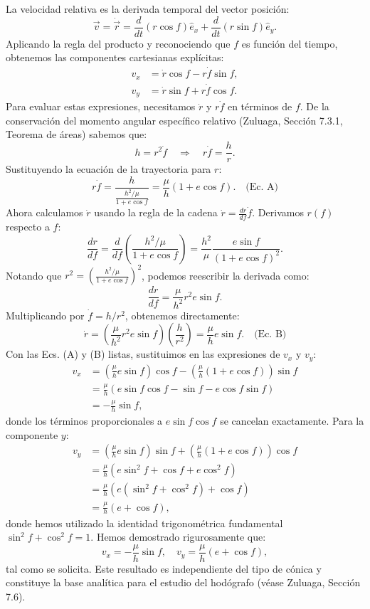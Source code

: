 \documentclass[12pt, a4paper]{article}
\begin{document}
La velocidad relativa es la derivada temporal del vector posición:
$$
\vec{v} = \dot{\vec{r}} = \frac{d}{dt}\left( r \cos f \right) \hat{e}_x + \frac{d}{dt}\left( r \sin f \right) \hat{e}_y.
$$
Aplicando la regla del producto y reconociendo que $f$ es función del tiempo, obtenemos las componentes cartesianas explícitas:
\begin{align*}
v_x &= \dot{r} \cos f - r \dot{f} \sin f, \\
v_y &= \dot{r} \sin f + r \dot{f} \cos f.
\end{align*}
Para evaluar estas expresiones, necesitamos $\dot{r}$ y $r\dot{f}$ en términos de $f$. De la conservación del momento angular específico relativo (Zuluaga, Sección 7.3.1, Teorema de áreas) sabemos que:
$$
h = r^2 \dot{f} \quad \Longrightarrow \quad r\dot{f} = \frac{h}{r}.
$$
Sustituyendo la ecuación de la trayectoria para $r$:
$$
r\dot{f} = \frac{h}{\frac{h^2/\mu}{1 + e \cos f}} = \frac{\mu}{h} (1 + e \cos f). \quad \text{(Ec. A)}
$$
Ahora calculamos $\dot{r}$ usando la regla de la cadena $\dot{r} = \frac{dr}{df} \dot{f}$. Derivamos $r(f)$ respecto a $f$:
$$
\frac{dr}{df} = \frac{d}{df} \left( \frac{h^2/\mu}{1 + e \cos f} \right) = \frac{h^2}{\mu} \frac{e \sin f}{(1 + e \cos f)^2}.
$$
Notando que $r^2 = \left( \frac{h^2/\mu}{1 + e \cos f} \right)^2$, podemos reescribir la derivada como:
$$
\frac{dr}{df} = \frac{\mu}{h^2} r^2 e \sin f.
$$
Multiplicando por $\dot{f} = h/r^2$, obtenemos directamente:
$$
\dot{r} = \left( \frac{\mu}{h^2} r^2 e \sin f \right) \left( \frac{h}{r^2} \right) = \frac{\mu}{h} e \sin f. \quad \text{(Ec. B)}
$$
Con las Ecs. (A) y (B) listas, sustituimos en las expresiones de $v_x$ y $v_y$:
\begin{align*}
v_x &= \left( \frac{\mu}{h} e \sin f \right) \cos f - \left( \frac{\mu}{h} (1 + e \cos f) \right) \sin f \\
&= \frac{\mu}{h} \left( e \sin f \cos f - \sin f - e \cos f \sin f \right) \\
&= -\frac{\mu}{h} \sin f,
\end{align*}
donde los términos proporcionales a $e \sin f \cos f$ se cancelan exactamente. Para la componente $y$:
\begin{align*}
v_y &= \left( \frac{\mu}{h} e \sin f \right) \sin f + \left( \frac{\mu}{h} (1 + e \cos f) \right) \cos f \\
&= \frac{\mu}{h} \left( e \sin^2 f + \cos f + e \cos^2 f \right) \\
&= \frac{\mu}{h} \left( e (\sin^2 f + \cos^2 f) + \cos f \right) \\
&= \frac{\mu}{h} (e + \cos f),
\end{align*}
donde hemos utilizado la identidad trigonométrica fundamental $\sin^2 f + \cos^2 f = 1$. Hemos demostrado rigurosamente que:
$$
v_x = -\frac{\mu}{h} \sin f, \quad v_y = \frac{\mu}{h} (e + \cos f),
$$
tal como se solicita. Este resultado es independiente del tipo de cónica y constituye la base analítica para el estudio del hodógrafo (véase Zuluaga, Sección 7.6).
\end{document}

